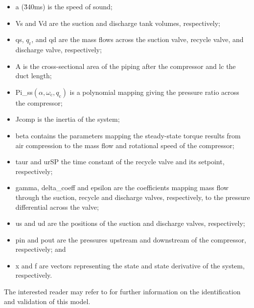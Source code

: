 \begin{itemize}[noitemsep]
  \item \gls{a} (\u{340}{m\per s}) is the speed of sound;
  \item \gls{Vs} and \gls{Vd} are the suction and discharge tank volumes, respectively;
  \item \gls{qs}, $q_\text{r}$, and \gls{qd} are the mass flows across the suction valve, recycle valve, and discharge valve, respectively;
  \item \gls{A} is the cross-sectional area of the piping after the compressor and \gls{lc} the duct length;
  \item \gls{Pi_ss}$\left(\alpha,\omega_\text{c}, q_\text{c} \right)$ is a polynomial mapping giving the pressure ratio across the compressor;
  \item \gls{Jcomp} is the inertia of the system;
  \item \gls{beta} contains the parameters mapping the steady-state torque results from air compression to the mass flow and rotational speed of the compressor;
  \item \gls{taur} and \gls{urSP} the time constant of the recycle valve and its setpoint, respectively;
  \item \gls{gamma}, \gls{delta_coeff} and \gls{epsilon} are the coefficients mapping mass flow through the suction, recycle and discharge valves, respectively, to the pressure differential across the valve;
  \item \gls{us} and \gls{ud} are the positions of the suction and discharge valves, respectively;
  \item \gls{pin} and \gls{pout} are the pressures upstream and downstream of the compressor, respectively; and
  \item \gls{x} and \gls{f} are vectors representing the state and state derivative of the system, respectively.
\end{itemize}

The interested reader may refer to \cite{Cortinovis2015} for further information on the identification and validation of this model.

